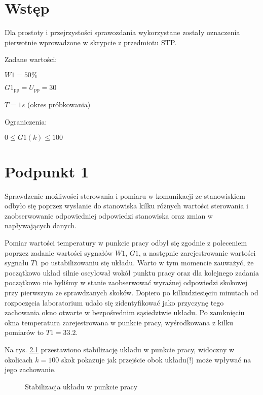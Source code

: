 \chapter{Wstęp}
Dla prostoty i przejrzystości sprawozdania wykorzystane zostały oznaczenia pierwotnie wprowadzone w skrypcie z przedmiotu STP.

\bigskip

Zadane wartości:

\smallskip

$W1=50\%$

\smallskip

$G1_{\mathrm{pp}}=U_{\mathrm{pp}}=30$

\smallskip

$T=1s$ (okres próbkowania)

\bigskip

Ograniczenia:

\smallskip

$0 \le G1(k) \le 100$

\chapter{Podpunkt 1}
Sprawdzenie możliwości sterowania i pomiaru w komunikacji ze stanowiskiem odbyło się poprzez wysłanie do stanowiska kilku różnych wartości sterowania i zaobserwowanie odpowiedniej odpowiedzi stanowiska oraz zmian w napływających danych.

Pomiar wartości temperatury w punkcie pracy odbył się zgodnie z poleceniem poprzez zadanie wartości sygnałów $W1$, $G1$, a następnie zarejestrowanie wartości sygnału $T1$ po ustabilizowaniu się układu. Warto w tym momencie zauważyć, że początkowo układ silnie oscylował wokół punktu pracy oraz dla kolejnego zadania początkowo nie byliśmy w stanie zaobserwować wyraźnej odpowiedzi skokowej przy pierwszym ze sprawdzanych skoków. Dopiero po kilkudziesięciu minutach od rozpoczęcia laboratorium udało się zidentyfikować jako przyczynę tego zachowania okno otwarte w bezpośrednim sąsiedztwie układu. Po zamknięciu okna temperatura zarejestrowana w punkcie pracy, wyśrodkowana z kilku pomiarów to $T1=\num{33,2}$.

Na rys. \ref{R1} przestawiono stabilizację układu w punkcie pracy, widoczny w okolicach $k=100$ skok pokazuje jak przejście obok układu(!) może wpływać na jego zachowanie.

\begin{figure}[ht]
\centering

\caption{Stabilizacja układu w punkcie pracy}
\label{R1}
\end{figure}

